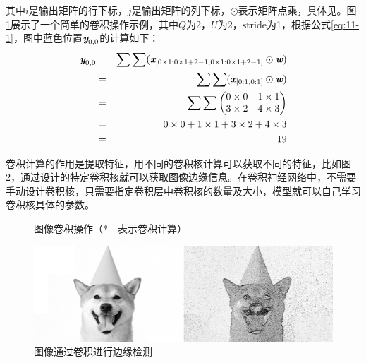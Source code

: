 \noindent 其中$i$是输出矩阵的行下标，$j$是输出矩阵的列下标，$\odot$表示矩阵点乘，具体见{\chapternine}。图\ref{fig:11-4}展示了一个简单的卷积操作示例，其中$Q$为2，$U$为2，$\textrm{stride}$为1，根据公式\eqref{eq:11-1}，图中蓝色位置$\textbf{\em y}_{0,0}$的计算如下：
\begin{eqnarray}
\textbf{\em y}_{0,0} &=& \sum \sum ( \textbf{\em x}_{[0\times 1:0\times 1+2-1,0\times 1:0\times 1+2-1]} \odot \textbf{\em w}) \nonumber \\
			 &=& \sum \sum ( \textbf{\em x}_{[0:1,0:1]} \odot \textbf{\em w} ) \nonumber \\
&=& \sum \sum \begin{pmatrix}
   0\times 0 & 1\times1\\
   3\times2 & 4\times3
\end{pmatrix} \nonumber \\
			 &=& 0 \times 0 + 1 \times 1 + 3 \times 2 + 4 \times 3 \nonumber \\
			 &=& 19
\label{eq:11-2}
\end{eqnarray}

\parinterval 卷积计算的作用是提取特征，用不同的卷积核计算可以获取不同的特征，比如图\ref{fig:11-5}，通过设计的特定卷积核就可以获取图像边缘信息。在卷积神经网络中，不需要手动设计卷积核，只需要指定卷积层中卷积核的数量及大小，模型就可以自己学习卷积核具体的参数。

\begin{figure}[htp]
\centering

\caption{图像卷积操作（*\ \ 表示卷积计算）}
\label{fig:11-4}
\end{figure}


\begin{figure}[htp]
\centering
%
\includegraphics[scale=0.3]{./Chapter11/Figures/figure-dog-1.jpg}
\caption{图像通过卷积进行边缘检测}
\label{fig:11-5}
\end{figure}

